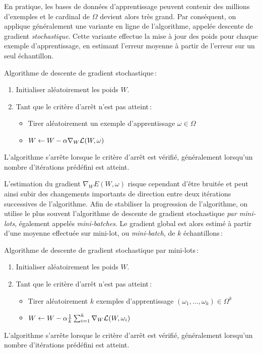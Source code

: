  En pratique, les bases de données d'apprentissage peuvent contenir des millions d'exemples et le cardinal de $\Omega$ devient alors très grand. Par conséquent, on applique généralement une variante en ligne de l'algorithme, appelée descente de gradient \emph{stochastique}. Cette variante effectue la mise à jour des poids pour chaque exemple d'apprentissage, en estimant l'erreur moyenne à partir de l'erreur sur un seul échantillon.
\begin{definition}
  Algorithme de descente de gradient stochastique\,:
  \begin{enumerate}
    \item Initialiser aléatoirement les poids $W$.
    \item Tant que le critère d'arrêt n'est pas atteint\,:
      \begin{itemize}
          \item Tirer aléatoirement un exemple d'apprentissage $\omega \in \Omega$
          \item $W \leftarrow W - \alpha \nabla_W \mathcal{L}(W, \omega)$
      \end{itemize}
  \end{enumerate}
L'algorithme s'arrête lorsque le critère d'arrêt est vérifié, généralement lorsqu'un nombre d'itérations prédéfini est atteint.
\end{definition}

L'estimation du gradient $\nabla_W E(W, \omega)$ risque cependant d'être bruitée et peut ainsi subir des changements importants de direction entre deux itérations successives de l'algorithme. Afin de stabiliser la progression de l'algorithme, on utilise le plus souvent l'algorithme de descente de gradient stochastique \emph{par mini-lots}, également appelés \emph{mini-batches}. Le gradient global est alors estimé à partir d'une moyenne effectuée sur mini-lot, ou \emph{mini-batch}, de $k$ échantillons\,:
\begin{definition}
  Algorithme de descente de gradient stochastique par mini-lots\,:
  \begin{enumerate}
    \item Initialiser aléatoirement les poids $W$.
    \item Tant que le critère d'arrêt n'est pas atteint\,:
      \begin{itemize}
          \item Tirer aléatoirement $k$ exemples d'apprentissage $(\omega_1,\dots,\omega_k) \in \Omega^k$
          \item $W \leftarrow W - \alpha \frac{1}{k} \sum_{i=1}^k \nabla_W \mathcal{L}(W, \omega_i)$
      \end{itemize}
  \end{enumerate}
L'algorithme s'arrête lorsque le critère d'arrêt est vérifié, généralement lorsqu'un nombre d'itérations prédéfini est atteint.
\end{definition}

